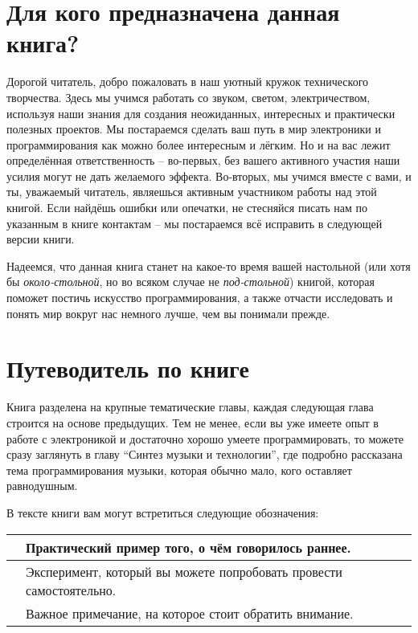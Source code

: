 \documentclass[../sparc.tex]{subfiles}
\begin{document}
\section*{Для кого предназначена данная книга?}

Дорогой читатель, добро пожаловать в наш уютный кружок технического творчества.
Здесь мы учимся работать со звуком, светом, электричеством, используя наши
знания для создания неожиданных, интересных и практически полезных проектов. Мы
постараемся сделать ваш путь в мир электроники и программирования как можно
более интересным и лёгким. Но и на вас лежит определённая ответственность --
во-первых, без вашего активного участия наши усилия могут не дать желаемого
эффекта. Во-вторых, мы учимся вместе с вами, и ты, уважаемый читатель, являешься
активным участником работы над этой книгой. Если найдёшь ошибки или опечатки, не
стесняйся писать нам по указанным в книге контактам -- мы постараемся всё
исправить в следующей версии книги.

Надеемся, что данная книга станет на какое-то время вашей настольной (или хотя
бы \emph{около-стольной}, но во всяком случае не \emph{под-стольной}) книгой,
которая поможет постичь искусство программирования, а также отчасти исследовать
и понять мир вокруг нас немного лучше, чем вы понимали прежде.

\section*{Путеводитель по книге}

Книга разделена на крупные тематические главы, каждая следующая глава строится
на основе предыдущих.  Тем не менее, если вы уже имеете опыт в работе с
электроникой и достаточно хорошо умеете программировать, то можете сразу
заглянуть в главу ``Синтез музыки и технологии'', где подробно рассказана тема
программирования музыки, которая обычно мало,  кого оставляет равнодушным.

В тексте книги вам могут встретиться следующие обозначения:

\begin{table}[H]
  \centering
  \def\arraystretch{3.0}%
  \begin{tabular}{|m{4em}|m{15em}|}
    \hline
    
    & Практический пример того, о чём говорилось раннее. \\
    \hline
    
    & Эксперимент, который вы можете попробовать провести самостоятельно. \\
    \hline
    
    & Важное примечание, на которое стоит обратить внимание. \\
    \hline
  \end{tabular}
\end{table}
\end{document}
